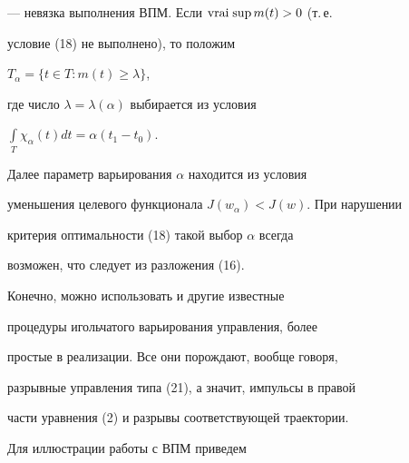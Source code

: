 --- невязка выполнения ВПМ. Если $\operatorname{vrai\;sup} m(t) > 0$ (т.\,е.


условие (18) не выполнено), то положим


$T_\alpha = \{ t\in T: m(t)\ge \lambda\}$,


где число $\lambda = \lambda(\alpha)$ выбирается из условия


$\int\limits_T \chi_\alpha(t)dt = \alpha(t_1-t_0)$.


Далее параметр варьирования $\alpha$ находится из условия 


уменьшения целевого функционала $J(w_\alpha)<J(w)$. При нарушении


критерия оптимальности (18) такой выбор $\alpha$ всегда


возможен, что следует из разложения (16).





Конечно, можно использовать и другие известные 


процедуры игольчатого варьирования управления, более 


простые в реализации. Все они порождают, вообще говоря, 


разрывные управления типа (21), а значит, импульсы в правой


части уравнения (2) и разрывы соответствующей траектории.





Для иллюстрации работы с ВПМ приведем






